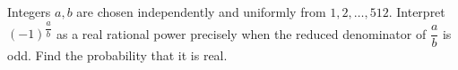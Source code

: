 Integers $a,b$ are chosen independently and uniformly from $1,2,\ldots,512$. Interpret $(-1)^{\dfrac{a}{b}}$ as a real rational power precisely when the reduced denominator of $\dfrac{a}{b}$ is odd. Find the probability that it is real.
